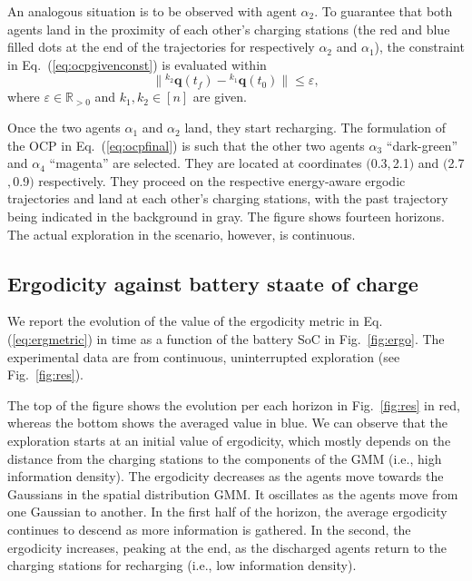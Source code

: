 \documentclass[letterpaper,10pt,conference,twoside]{IEEEtran}
\theoremstyle{definition}
\begin{document}
An analogous situation is to be observed with agent $\alpha_2$. %
To guarantee that both agents land in the proximity of each other's charging stations (the red and blue filled dots at the end of the trajectories for respectively $\alpha_2$ and $\alpha_1$), %
the constraint in Eq.~(\ref{eq:ocpgivenconst}) is evaluated within
\begin{equation}\label{eq:resaddconst}
  \lVert{}^{k_2}\mathbf{q}(t_f)-{}^{k_1}\mathbf{q}(t_0)\rVert\leq\varepsilon,
\end{equation} 
where $\varepsilon\in\mathbb{R}_{>0}$ and $k_1,k_2\in[n]$ are given.

Once the two agents $\alpha_1$ and $\alpha_2$ land, they start recharging. The formulation of the OCP in Eq.~(\ref{eq:ocpfinal}) is such that the other two agents $\alpha_3$ ``dark-green'' and $\alpha_4$ ``magenta'' are selected. They are located at coordinates $($0.3$,$2.1$)$ and $($2.7$,$0.9$)$ respectively. They proceed on the respective energy-aware ergodic trajectories and land at each other's charging stations, with the past trajectory being indicated in the background in gray. The figure shows fourteen horizons. The actual exploration in the scenario, however, is continuous. 

\subsection*{Ergodicity against battery staate of charge}
\noindent
We report the evolution of the value of the ergodicity metric in Eq. (\ref{eq:ergmetric}) in time as a function of the battery SoC in Fig.~\ref{fig:ergo}. The experimental data are from continuous, uninterrupted exploration (see Fig.~\ref{fig:res}).

The top of the figure shows the evolution per each horizon in Fig.~\ref{fig:res} in red, whereas the bottom shows the averaged value in blue. We can observe that the exploration starts at an initial value of ergodicity, which mostly depends on the distance from the charging stations to the components of the GMM (i.e., high information density). The ergodicity decreases as the agents move towards the Gaussians in the spatial distribution GMM. It oscillates as the agents move from one Gaussian to another. In the first half of the horizon, the average ergodicity continues to descend as more information is gathered. In the second, the ergodicity increases, peaking at the end, as the discharged agents return to the charging stations for recharging (i.e., low information density).
\end{document}
